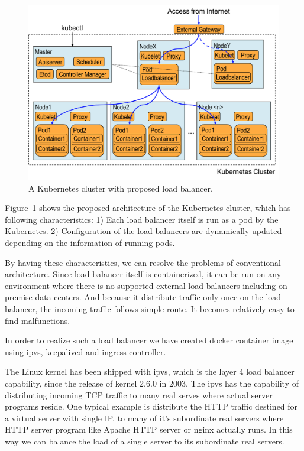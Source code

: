 \begin{figure}
\includegraphics[width=\columnwidth]{Figs/K8sProposed}
\caption{A Kubernetes cluster with proposed load balancer.}
\label{fig:K8sProposed}
\end{figure}

Figure~\ref{fig:K8sProposed} shows the proposed architecture of the Kubernetes cluster, 
which has following characteristics:
1) Each load balancer itself is run as a pod by the Kubernetes. 
2) Configuration of the load balancers are dynamically updated depending on the information of running pods.

By having these characteristics, we can resolve the problems of conventional architecture.
Since load balancer itself is containerized, it can be run on any environment 
where there is no supported external load balancers including on-premise data centers.
And because it distribute traffic only once on the load balancer, the incoming traffic follows simple route. 
It becomes relatively easy to find malfunctions.

In order to realize such a load balancer we have created docker container image using ipvs, keepalived and 
ingress controller.

The Linux kernel has been shipped with ipvs, which is the layer 4 load balancer capability,
since the release of kernel 2.6.0 in 2003. 
The ipvs has the capability of distributing incoming TCP traffic to many real serves where actual server programs reside.
One typical example is distribute the HTTP traffic destined for a virtual server with single IP, 
to many of it's subordinate real servers where HTTP server program like Apache HTTP server or nginx actually runs.
In this way we can balance the load of a single server to its subordinate real servers.

